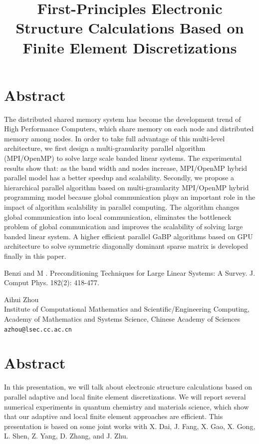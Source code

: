 \documentclass[article,A4,11pt]{llncs}%
\begin{document}
\section*{Abstract}
The distributed shared memory system has become the development trend of High Performance Computers, which share memory on each node and distributed memory among nodes. In order to take full advantage of this multi-level architecture, we first design a multi-granularity parallel algorithm (MPI/OpenMP) to solve large scale banded linear systems. The experimental results show that: as the band width and nodes increase, MPI/OpenMP hybrid parallel model has a better speedup and scalability. Secondly, we propose a hierarchical parallel algorithm based on multi-granularity MPI/OpenMP hybrid programming model because global communication plays an important role in the impact of algorithm scalability in parallel computing. The algorithm changes global communication into local communication, eliminates the bottleneck problem of global communication and improves the scalability of solving large banded linear system. A higher efficient parallel GaBP algorithms based on GPU architecture to solve symmetric diagonally dominant sparse matrix is developed finally in this paper.


\begin{thebibliography}{10}
{\sc Benzi  and M }. {Preconditioning Techniques for Large Linear Systems: A Survey}. J. Comput Phys. 182(2): 418-477.
\end{thebibliography}

\title{First-Principles Electronic Structure Calculations Based on Finite Element Discretizations}
 \author{} \institute{}
\maketitle
\begin{center}
{\large Aihui Zhou}\\
Institute of Computational Mathematics and Scientific/Engineering Computing, Academy of Mathematics and Systems Science, Chinese Academy of Sciences\\
{\tt azhou@lsec.cc.ac.cn}
\end{center}

\section*{Abstract}
In this presentation, we will talk about
electronic structure calculations based on parallel adaptive and local finite
element discretizations. We will report several numerical
experiments in quantum chemistry and materials science, which show that our adaptive and
local finite element approaches are efficient. This presentation is
based on some joint works with X. Dai, J. Fang, X. Gao, X. Gong, L. Shen, Z. Yang,
D. Zhang, and J. Zhu.
\end{document}
